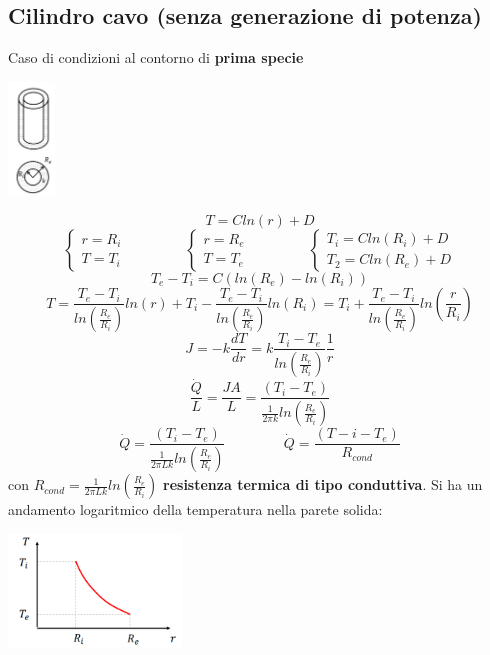\subsection{Cilindro cavo (senza generazione di potenza)}
Caso di condizioni al contorno di \textbf{prima specie}
\begin{center}
    \includegraphics[height=3cm]{../L10/img7.PNG}
\end{center}
\[
    T= C ln(r) + D
\]
\[
    \begin{cases}
        r = R_i \\ T = T_i
    \end{cases} \;\;\;\;\;\;\;\;\;\;\;\;\;\;\;\begin{cases}
        r= R_e \\ T=T_e 
    \end{cases}\;\;\;\;\;\;\;\;\;\;\;\;\;\;\; \begin{cases}
        T_i = C ln(R_i) + D \\ T_2 = C ln (R_e) + D
    \end{cases}
\]
\[
    T_e-T_i = C(ln(R_e) - ln(R_i))
\]
\[
    T= \frac{T_e-T_i}{ln\left(\frac{R_e}{R_i}\right)}ln(r) + T_i - \frac{T_e-T_i}{ln\left(\frac{R_e}{R_i}\right)}ln(R_i) = T_i + \frac{T_e-T_i}{ln\left(\frac{R_e}{R_i}\right)}ln\left(\frac{r}{R_i}\right)
\]
\[
    J = -k \frac{dT}{dr} = k \frac{T_i-T_e}{ln\left(\frac{R_e}{R_i}\right)} \frac{1}{r}
\]
\[
    \frac{\dot{Q}}{L} = \frac{JA}{L} = \frac{(T_i-T_e)}{\frac{1}{2\pi k}ln\left(\frac{R_e}{R_i}\right)}
\]
\[
    \dot{Q} = \frac{(T_i-T_e)}{\frac{1}{2\pi L k}ln\left(\frac{R_e}{R_i}\right)} \;\;\;\;\;\;\;\;\;\;\;\;\;\;\; \dot{Q} = \frac{(T-i-T_e)}{R_{cond}}
\]
con $R_{cond} = \frac{1}{2 \pi L k}ln\left(\frac{R_e}{R_i}\right)$ \textbf{resistenza termica di tipo conduttiva}.\newline
\newline
Si ha un andamento logaritmico della temperatura nella parete solida:
\begin{center}
    \includegraphics[height=3cm]{../L10/img8.PNG}
\end{center}
